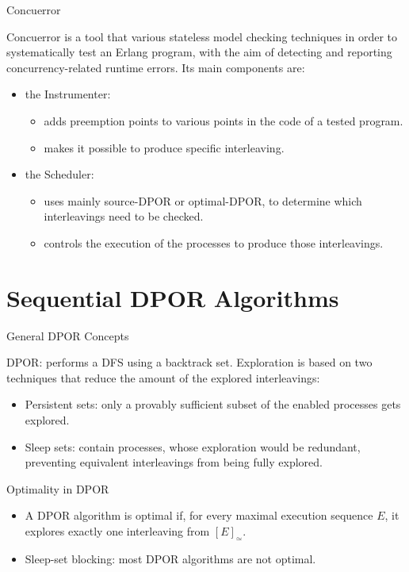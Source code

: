 \documentclass[9pt]{beamer}
\begin{document}
\begin{frame} {Concuerror}

Concuerror is a tool that various stateless model checking techniques
in order to systematically 
test an Erlang program, with the aim of detecting and reporting concurrency-related runtime errors.
Its main components are:

\begin{itemize}
\item the Instrumenter:
  \begin{itemize}
  \item adds preemption points to various points in the code of a tested program.
  \item makes it possible to produce specific interleaving.
  \end{itemize}

\item the Scheduler:
  \begin{itemize}
  \item uses mainly source-DPOR or optimal-DPOR, to determine which interleavings need to be checked.
  \item controls the execution of the processes to produce those interleavings.
  \end{itemize}
\end{itemize}

 
\end{frame}


\section{Sequential DPOR Algorithms}


\begin{frame} {General DPOR Concepts}

DPOR: performs a DFS using a backtrack set. Exploration is based on two techniques that reduce the amount of the explored interleavings:
\begin{itemize}[<+->]
    \item Persistent sets: only a provably sufficient subset of the enabled processes gets explored.
    \item Sleep sets: contain processes, whose exploration would be redundant, 
    preventing equivalent interleavings from being fully explored.
\end{itemize}

\end{frame}

\begin{frame} {Optimality in DPOR}

\begin{itemize}
\item A DPOR algorithm is optimal if, for every maximal execution sequence $E$, it explores exactly one interleaving from 
$[E]_{\simeq}$.
\item Sleep-set blocking: most DPOR algorithms are not optimal.
\end{itemize}
\end{frame}
\end{document}
